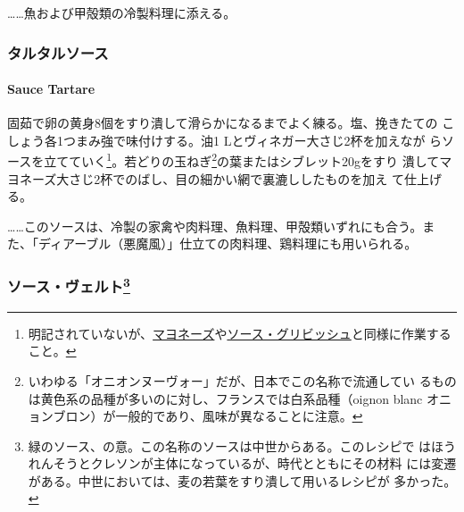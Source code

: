 \begin{recette}
\ldots{}\ldots{}魚および甲殻類の冷製料理に添える。

\maeaki

\hypertarget{ux30bfux30ebux30bfux30ebux30bdux30fcux30b9}{%
\subsubsection{タルタルソース}\label{ux30bfux30ebux30bfux30ebux30bdux30fcux30b9}}

\hypertarget{sauce-tartare}{%
\paragraph{Sauce Tartare}\label{sauce-tartare}}


固茹で卵の黄身8個をすり潰して滑らかになるまでよく練る。塩、挽きたての
こしょう各1つまみ強で味付けする。油1 Lとヴィネガー大さじ2杯を加えなが
らソースを立てていく\footnote{明記されていないが、\protect\hyperlink{mayonnaise}{マヨネーズ}や\protect\hyperlink{sauce-gribiche}{ソース・グリビッシュ}と同様に作業すること。}。若どりの玉ねぎ\footnote{いわゆる「オニオンヌーヴォー」だが、日本でこの名称で流通してい
  るものは黄色系の品種が多いのに対し、フランスでは白系品種（oignon blanc
  オニョンブロン）が一般的であり、風味が異なることに注意。}の葉またはシブレット20gをすり
潰してマヨネーズ大さじ2杯でのばし、目の細かい網で裏漉ししたものを加え
て仕上げる。

\ldots{}\ldots{}このソースは、冷製の家禽や肉料理、魚料理、甲殻類いずれにも合う。ま
た、「ディアーブル（悪魔風）」仕立ての肉料理、鶏料理にも用いられる。

\maeaki

\hypertarget{ux30bdux30fcux30b9ux30f4ux30a7ux30ebux30c841}{%
\subsubsection[ソース・ヴェルト]{\texorpdfstring{ソース・ヴェルト\footnote{緑のソース、の意。この名称のソースは中世からある。このレシピで
  はほうれんそうとクレソンが主体になっているが、時代とともにその材料
  には変遷がある。中世においては、麦の若葉をすり潰して用いるレシピが
  多かった。}}{ソース・ヴェルト}}\label{ux30bdux30fcux30b9ux30f4ux30a7ux30ebux30c841}}


\end{recette}
